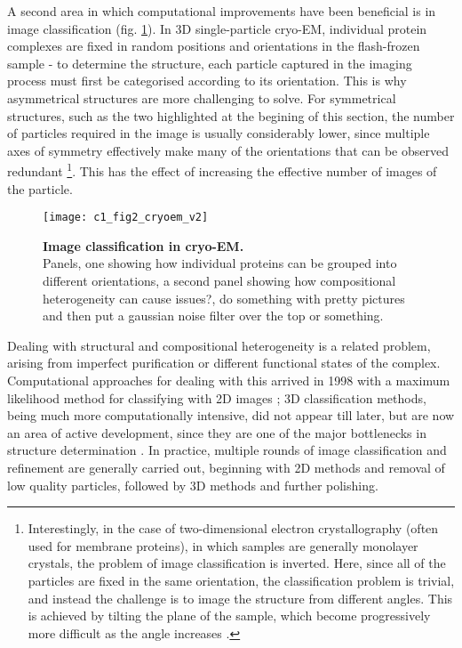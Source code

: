 \documentclass[a4paper,11pt,twoside,openright]{scrbook}
\begin{document}
A second area in which computational improvements have been beneficial is in image classification (fig. \ref{c1fig2}). In 3D single-particle cryo-EM, individual protein complexes are fixed in random positions and orientations in the flash-frozen sample - to determine the structure, each particle captured in the imaging process must first be categorised according to its orientation. This is why asymmetrical structures are more challenging to solve. For symmetrical structures, such as the two highlighted at the begining of this section, the number of particles required in the image is usually considerably lower, since multiple axes of symmetry effectively make many of the orientations that can be observed redundant \footnote{Interestingly, in the case of two-dimensional electron crystallography (often used for membrane proteins), in which samples are generally monolayer crystals, the problem of image classification is inverted. Here, since all of the particles are fixed in the same orientation, the classification problem is trivial, and instead the challenge is to image the structure from different angles. This is achieved by tilting the plane of the sample, which become progressively more difficult as the angle increases \cite{Wisedchaisri2011}.}. This has the effect of increasing the effective number of images of the particle.
\clearpage
\begin{figure}
    \texttt{[image: c1\_fig2\_cryoem\_v2]}
    \caption[Image classification in cryo-EM]{\sffamily \textbf{Image classification in cryo-EM.} \\  Panels, one showing how individual proteins can be grouped into different orientations, a second panel showing how compositional heterogeneity can cause issues?, do something with pretty pictures and then put a gaussian noise filter over the top or something.}
    \label{c1fig2}
\end{figure}
\clearpage

Dealing with structural and compositional heterogeneity is a related problem, arising from imperfect purification or different functional states of the complex. Computational approaches for dealing with this arrived in 1998 with a maximum likelihood method for classifying with 2D images \cite{Sigworth1998}; 3D classification methods, being much more computationally intensive, did not appear till later, but are now an area of active development, since they are one of the major bottlenecks in structure determination \cite{Scheres2007,Lyumkis2013,Punjani2017}. In practice, multiple rounds of image classification and refinement are generally carried out, beginning with 2D methods and removal of low quality particles, followed by 3D methods and further polishing.
\end{document}
